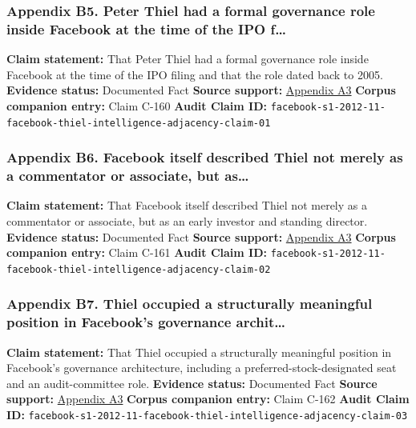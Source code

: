 \documentclass[
  american,
  11pt,
  letterpaper,
]{article}
\begin{document}
\subsubsection{Appendix B5. Peter Thiel had a formal governance role
inside Facebook at the time of the IPO
f\ldots{}}\label{appendix-b5-peter-thiel-had-a-formal-governance-role-inside-facebook-at-the-time-of-the-ipo-f}

\textbf{Claim statement:} That Peter Thiel had a formal governance role
inside Facebook at the time of the IPO filing and that the role dated
back to 2005. \textbf{Evidence status:} Documented Fact \textbf{Source
support:}
\hyperref[appendix-a3-facebook-inc-registration-statement-on-form-s-1]{Appendix
A3} \textbf{Corpus companion entry:} Claim C-160 \textbf{Audit Claim
ID:}
\texttt{facebook-s1-2012-11-facebook-thiel-intelligence-adjacency-claim-01}

\subsubsection{Appendix B6. Facebook itself described Thiel not merely
as a commentator or associate, but
as\ldots{}}\label{appendix-b6-facebook-itself-described-thiel-not-merely-as-a-commentator-or-associate-but-as}

\textbf{Claim statement:} That Facebook itself described Thiel not
merely as a commentator or associate, but as an early investor and
standing director. \textbf{Evidence status:} Documented Fact
\textbf{Source support:}
\hyperref[appendix-a3-facebook-inc-registration-statement-on-form-s-1]{Appendix
A3} \textbf{Corpus companion entry:} Claim C-161 \textbf{Audit Claim
ID:}
\texttt{facebook-s1-2012-11-facebook-thiel-intelligence-adjacency-claim-02}

\subsubsection{Appendix B7. Thiel occupied a structurally meaningful
position in Facebook's governance
archit\ldots{}}\label{appendix-b7-thiel-occupied-a-structurally-meaningful-position-in-facebook-s-governance-archit}

\textbf{Claim statement:} That Thiel occupied a structurally meaningful
position in Facebook's governance architecture, including a
preferred-stock-designated seat and an audit-committee role.
\textbf{Evidence status:} Documented Fact \textbf{Source support:}
\hyperref[appendix-a3-facebook-inc-registration-statement-on-form-s-1]{Appendix
A3} \textbf{Corpus companion entry:} Claim C-162 \textbf{Audit Claim
ID:}
\texttt{facebook-s1-2012-11-facebook-thiel-intelligence-adjacency-claim-03}
\end{document}
